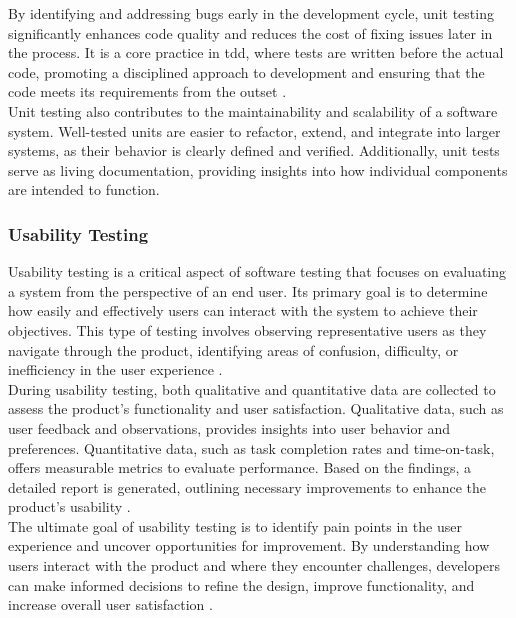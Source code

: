 {By identifying and addressing bugs early in the development cycle, unit testing significantly enhances code quality and reduces the cost of fixing issues later in the process. It is a core practice in \gls{tdd}, where tests are written before the actual code, promoting a disciplined approach to development and ensuring that the code meets its requirements from the outset \cite{geeksforgeeks:unit-test}. \\

Unit testing also contributes to the maintainability and scalability of a software system. Well-tested units are easier to refactor, extend, and integrate into larger systems, as their behavior is clearly defined and verified. Additionally, unit tests serve as living documentation, providing insights into how individual components are intended to function.

\subsubsection*{Usability Testing}
\label{subsec:usability-testing}

Usability testing is a critical aspect of software testing that focuses on evaluating a system from the perspective of an end user. Its primary goal is to determine how easily and effectively users can interact with the system to achieve their objectives. This type of testing involves observing representative users as they navigate through the product, identifying areas of confusion, difficulty, or inefficiency in the user experience \cite{geeksforgeeks:user-test}. \\

During usability testing, both qualitative and quantitative data are collected to assess the product's functionality and user satisfaction. Qualitative data, such as user feedback and observations, provides insights into user behavior and preferences. Quantitative data, such as task completion rates and time-on-task, offers measurable metrics to evaluate performance. Based on the findings, a detailed report is generated, outlining necessary improvements to enhance the product's usability \cite{geeksforgeeks:user-test}. \\

The ultimate goal of usability testing is to identify pain points in the user experience and uncover opportunities for improvement. By understanding how users interact with the product and where they encounter challenges, developers can make informed decisions to refine the design, improve functionality, and increase overall user satisfaction \cite{geeksforgeeks:user-test}.

}
